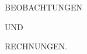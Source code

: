 \newcommand{\EarthSymbol}{\text{\mdseries\AstroSymbols ♁}}
\clearpage\thispagestyle{empty}%
\begin{center}
\vspace*{.22\textheight}
{\Large BEOBACHTUNGEN\par}
\vspace{14mm}
UND\par
\vspace{14mm}
{\Large RECHNUNGEN.\par}
\end{center}
\clearpage
\thispagestyle{empty}
\noindent{}\null\par
\clearpage
